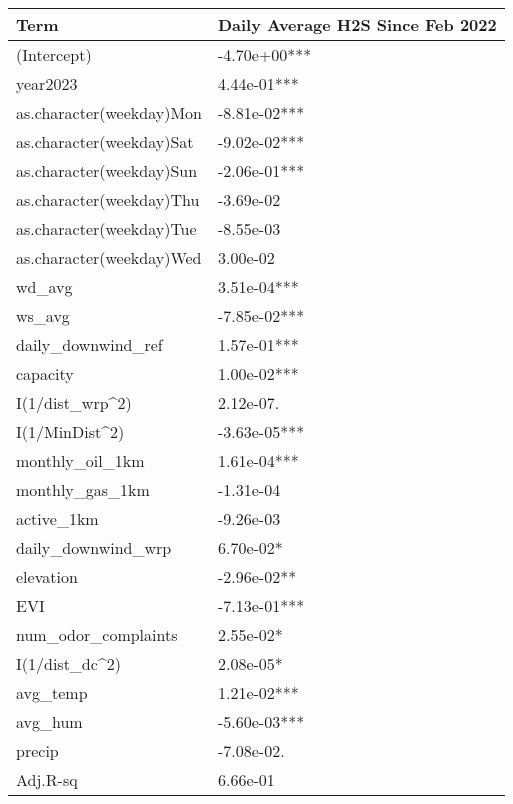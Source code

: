 
\begin{tabular}{l|l}
\hline
Term & Daily Average H2S Since Feb 2022\\
\hline
(Intercept) & -4.70e+00***\\
\hline
year2023 & 4.44e-01***\\
\hline
as.character(weekday)Mon & -8.81e-02***\\
\hline
as.character(weekday)Sat & -9.02e-02***\\
\hline
as.character(weekday)Sun & -2.06e-01***\\
\hline
as.character(weekday)Thu & -3.69e-02\\
\hline
as.character(weekday)Tue & -8.55e-03\\
\hline
as.character(weekday)Wed & 3.00e-02\\
\hline
wd\_avg & 3.51e-04***\\
\hline
ws\_avg & -7.85e-02***\\
\hline
daily\_downwind\_ref & 1.57e-01***\\
\hline
capacity & 1.00e-02***\\
\hline
I(1/dist\_wrp\textasciicircum{}2) & 2.12e-07.\\
\hline
I(1/MinDist\textasciicircum{}2) & -3.63e-05***\\
\hline
monthly\_oil\_1km & 1.61e-04***\\
\hline
monthly\_gas\_1km & -1.31e-04\\
\hline
active\_1km & -9.26e-03\\
\hline
daily\_downwind\_wrp & 6.70e-02*\\
\hline
elevation & -2.96e-02**\\
\hline
EVI & -7.13e-01***\\
\hline
num\_odor\_complaints & 2.55e-02*\\
\hline
I(1/dist\_dc\textasciicircum{}2) & 2.08e-05*\\
\hline
avg\_temp & 1.21e-02***\\
\hline
avg\_hum & -5.60e-03***\\
\hline
precip & -7.08e-02.\\
\hline
Adj.R-sq & 6.66e-01\\
\hline
\end{tabular}
